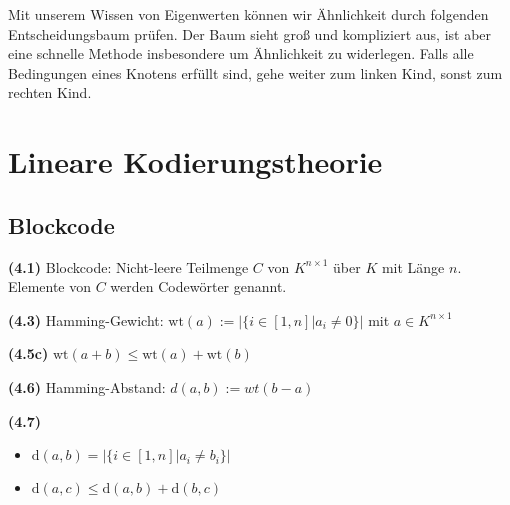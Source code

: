 \documentclass[a4paper,parskip=half*,DIV=15,fontsize=11pt]{scrartcl}
\newlength{\hangwidth}
\newcommand{\skript}[1]{\settowidth{\hangwidth}{\textbf{(#1)} }\hangpara{\hangwidth}{1}\textbf{(#1)} \ignorespaces} %
\newcommand{\GL}{\mathrm{GL}} %
\newcommand{\geo}{\mathrm{g}} %
\newcommand{\mul}{\mathrm{m}} %
\begin{document}
Mit unserem Wissen von Eigenwerten können wir Ähnlichkeit durch folgenden Entscheidungsbaum prüfen. Der Baum sieht groß und kompliziert aus, ist aber eine schnelle Methode insbesondere um Ähnlichkeit zu widerlegen. Falls alle Bedingungen eines Knotens erfüllt sind, gehe weiter zum linken Kind, sonst zum rechten Kind.


\section{Lineare Kodierungstheorie}

\subsection{Blockcode}

\skript{4.1} Blockcode: Nicht-leere Teilmenge $C$ von $K^{n \times 1}$ über $K$ mit Länge $n$. Elemente von $C$ werden Codewörter genannt.

\skript{4.3} Hamming-Gewicht: $\mathrm{wt}(a):=|\{i \in [1,n]|a_i \neq 0\}|$ mit $a \in K^{n \times 1}$

\skript{4.5c} $\mathrm{wt}(a+b) \leq \mathrm{wt}(a)+ \mathrm{wt}(b)$

\skript{4.6} Hamming-Abstand: $d(a,b):=wt(b-a)$

\skript{4.7} \begin{itemize} \item $\mathrm{d}(a,b)=|\{i \in [1,n]|a_i \neq b_i\}|$
	\item $\mathrm{d}(a,c) \leq \mathrm{d}(a,b)+\mathrm{d}(b,c)$
\end{itemize}
\end{document}
